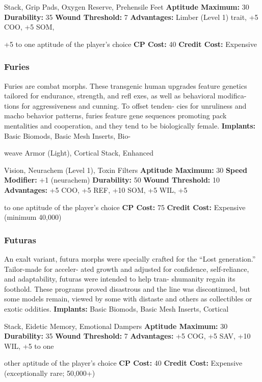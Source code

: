 Stack, Grip Pads, Oxygen Reserve, Prehensile Feet
\textbf{Aptitude Maximum: }30
\textbf{Durability: }35
\textbf{Wound Threshold: }7
\textbf{Advantages:} Limber (Level 1) trait, +5 COO, +5 SOM, 

+5 to one aptitude of the player's choice
\textbf{CP Cost: }40
\textbf{Credit Cost: }Expensive

\subsubsection{Furies}

Furies are combat morphs. These transgenic human 
upgrades feature genetics tailored for endurance, 
strength, and refl exes, as well as behavioral modifica-
tions for aggressiveness and cunning. To offset tenden-
cies for unruliness and macho behavior patterns, furies 
feature gene sequences promoting pack mentalities and 
cooperation, and they tend to be biologically female.
\textbf{Implants:  }Basic Biomods, Basic Mesh Inserts, Bio-

weave Armor (Light), Cortical Stack, Enhanced 

Vision, Neurachem (Level 1), Toxin Filters
\textbf{Aptitude Maximum: }30
\textbf{Speed Modifier: }+1 (neurachem)
\textbf{Durability:} 50
\textbf{Wound Threshold:} 10
\textbf{Advantages:} +5 COO, +5 REF, +10 SOM, +5 WIL, +5 

to one aptitude of the player's choice
\textbf{CP Cost:} 75
\textbf{Credit Cost: }Expensive (minimum 40,000)

\subsubsection{Futuras}

An exalt variant, futura morphs were specially crafted 
for the ``Lost generation.'' Tailor-made for acceler-
ated growth and adjusted for confidence, self-reliance, 
and adaptability, futuras were intended to help tran-
shumanity regain its foothold. These programs proved 
disastrous and the line was discontinued, but some 
models remain, viewed by some with distaste and 
others as collectibles or exotic oddities.
\textbf{Implants: }Basic Biomods, Basic Mesh Inserts, Cortical 

Stack, Eidetic Memory, Emotional Dampers
\textbf{Aptitude Maximum: }30
\textbf{Durability:} 35
\textbf{Wound Threshold: }7
\textbf{Advantages: }+5 COG, +5 SAV, +10 WIL, +5 to one 

other aptitude of the player's choice
\textbf{CP Cost: }40
\textbf{Credit Cost: }Expensive (exceptionally rare; 50,000+)

